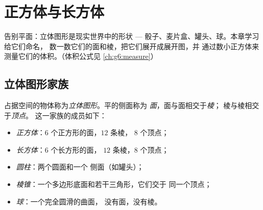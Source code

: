\chapter{正方体与长方体}\label{ch:g5:solids}

告别平面：立体图形是现实世界中的形状 ---
骰子、麦片盒、罐头、球。本章学习给它们命名，
数一数它们的面和棱，把它们展开成展开图，并
通过数小正方体来测量它们的体积。（体积公式见
\cref{ch:g6:measure}）

\section{立体图形家族}

\begin{definition}[立体图形及其相关词汇]\label{def:g5:solids:def}
占据空间的物体称为\emph{立体图形}。平的侧面称为
\emph{面}，面与面相交于\emph{棱}；
棱与棱相交于\emph{顶点}。
这一家族的成员如下：
\begin{itemize}
  \item \emph{正方体}：$6$ 个正方形的面，$12$ 条棱，
        $8$ 个顶点；
  \item \emph{长方体}：$6$ 个长方形的面，
        $12$ 条棱，$8$ 个顶点；
  \item \emph{圆柱}：两个圆面和一个
        侧面（如罐头）；
  \item \emph{棱锥}：一个多边形底面和若干三角形，它们交于
        同一个顶点；
  \item \emph{球}：一个完全圆滑的曲面，
        没有面，没有棱。
\end{itemize}
\end{definition}

